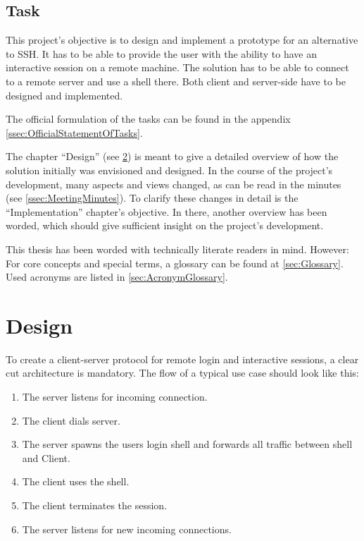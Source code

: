 \documentclass[10pt,a4paper,titlepage,twoside,english,final]{zhawreprt}
\begin{document}
\section{Task}\label{sec:Task}
This project's objective is to design and implement a prototype for an alternative to \gls{SSH}.
It has to be able to provide the user with the ability to have an interactive session on a remote machine.
The solution has to be able to connect to a remote server and use a \gls{shell} there.
Both client and server-side have to be designed and implemented.


The official formulation of the tasks can be found in the appendix \ref{ssec:OfficialStatementOfTasks}.

The chapter ``Design'' (see \ref{chp:Design}) is meant to give a detailed overview of how the solution initially was envisioned and designed.
In the course of the project's development, many aspects and views changed, as can be read in the minutes (see \ref{ssec:MeetingMinutes}).
To clarify these changes in detail is the ``Implementation'' chapter's objective.
In there, another overview has been worded, which should give sufficient insight on the project's development.

This thesis has been worded with technically literate readers in mind.
However: For core concepts and special terms, a glossary can be found at \ref{sec:Glossary}.
Used acronyms are listed in \ref{sec:AcronymGlossary}.



\chapter{Design}\label{chp:Design}
To create a client-server protocol for remote \gls{login} and interactive sessions, a clear cut architecture is mandatory.
The flow of a typical use case should look like this:

\begin{enumerate}
\item The server listens for incoming connection.
\item The client dials server.
\item The server spawns the users \gls{login} \gls{shell} and forwards all traffic between \gls{shell} and Client.
\item The client uses the \gls{shell}.
\item The client terminates the session.
\item The server listens for new incoming connections.
\end{enumerate}
\end{document}
